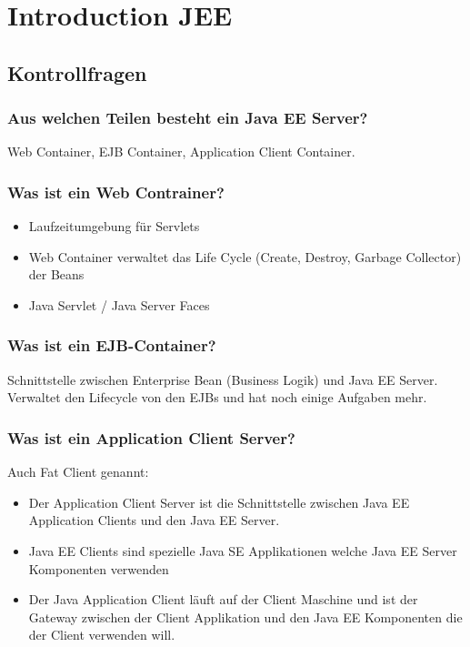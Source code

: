 \chapter{Introduction JEE}

\section{Kontrollfragen}

\subsection{Aus welchen Teilen besteht ein Java EE Server?}
Web Container, EJB Container, Application Client Container.

\subsection{Was ist ein Web Contrainer?}
\begin{itemize}
	\item Laufzeitumgebung für Servlets
	\item Web Container verwaltet das Life Cycle (Create, Destroy, Garbage Collector) der Beans
	\item Java Servlet / Java Server Faces
\end{itemize}

\subsection{Was ist ein EJB-Container?}
Schnittstelle zwischen Enterprise Bean (Business Logik) und Java EE Server. Verwaltet den Lifecycle von den EJBs und hat noch einige Aufgaben mehr.

\subsection{Was ist ein Application Client Server?}
Auch Fat Client genannt:
\begin{itemize}
	\item Der Application Client Server ist die Schnittstelle zwischen Java EE Application Clients und den Java EE Server.
	\item Java EE Clients sind spezielle Java SE Applikationen welche Java EE Server Komponenten verwenden
	\item Der Java Application Client läuft auf der Client Maschine und ist der Gateway zwischen der Client Applikation und den Java EE Komponenten die der Client verwenden will.
\end{itemize}

